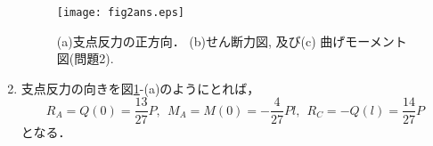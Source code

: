 \documentclass[10pt,a4j]{jarticle}
\begin{document}
\begin{enumerate}
\begin{figure}[h]
	\begin{center}
	\texttt{[image: fig2ans.eps]} 
	\end{center}
	\vspace{-5mm}
	\caption{(a)支点反力の正方向．
	(b)せん断力図, 及び(c) 曲げモーメント図(問題2).}
	\label{fig:fig2}
\end{figure}
\item
支点反力の向きを図\ref{fig:fig2}-(a)のようにとれば，
\begin{equation}
	R_A = Q(0) =  \frac{13}{27}P, \ \  
	M_A = M(0) =  -\frac{4}{27}Pl, \ \  
	R_C = -Q(l) =  \frac{14}{27}P
\end{equation}
となる．
\end{enumerate}
\end{document}
